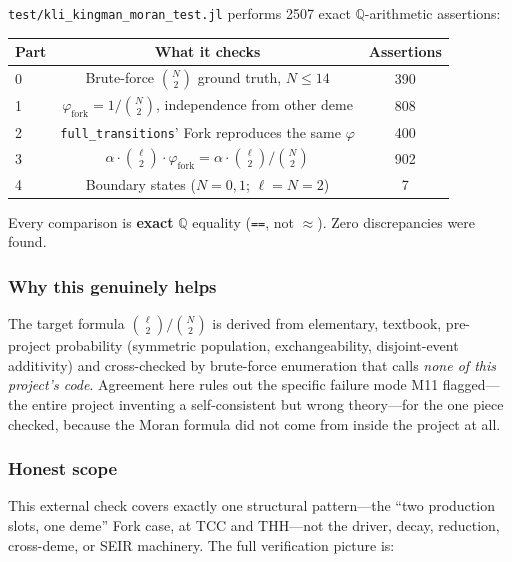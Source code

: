\documentclass[11pt,leqno]{article}
\newcommand{\code}[1]{\texttt{#1}}
\theoremstyle{plain}
\theoremstyle{definition}
\begin{document}
\code{test/kli\_kingman\_moran\_test.jl} performs 2507 exact
$\mathbb{Q}$-arithmetic assertions:
\begin{center}
\renewcommand{\arraystretch}{1.15}
\begin{tabular}{lcc}
\toprule
\textbf{Part} & \textbf{What it checks} & \textbf{Assertions} \\
\midrule
0 & Brute-force $\binom{N}{2}$ ground truth, $N \le 14$ & 390 \\
1 & $\varphi_{\text{fork}} = 1/\binom{N}{2}$, independence
    from other deme & 808 \\
2 & \code{full\_transitions}' Fork reproduces the same $\varphi$ &
    400 \\
3 & $\alpha \cdot \binom{\ell}{2} \cdot \varphi_{\text{fork}}
    = \alpha \cdot \binom{\ell}{2}/\binom{N}{2}$ & 902 \\
4 & Boundary states ($N = 0,1$; $\ell = N = 2$) & 7 \\
\bottomrule
\end{tabular}
\end{center}

Every comparison is \textbf{exact} $\mathbb{Q}$ equality (\code{==},
not $\approx$).  Zero discrepancies were found.

\subsubsection{Why this genuinely helps}

The target formula $\binom{\ell}{2}/\binom{N}{2}$ is derived from
elementary, textbook, pre-project probability (symmetric population,
exchangeability, disjoint-event additivity) and cross-checked by
brute-force enumeration that calls \emph{none of this project's code}.
Agreement here rules out the specific failure mode M11 flagged---the
entire project inventing a self-consistent but wrong theory---for the
one piece checked, because the Moran formula did not come from inside
the project at all.

\subsubsection{Honest scope}

This external check covers exactly one structural pattern---the ``two
production slots, one deme'' Fork case, at TCC and THH---not the
driver, decay, reduction, cross-deme, or SEIR machinery.  The full
verification picture is:
\end{document}
